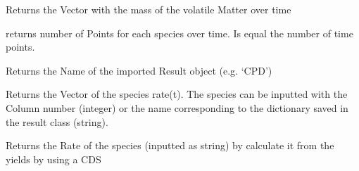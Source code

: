 \documentclass[letterpaper,10pt,english]{sphinxmanual}
\begin{document}
\begin{fulllineitems}
\begin{fulllineitems}
\end{fulllineitems}


\begin{fulllineitems}
\label{FittingClasses:FitInfo.Fit_one_run.MassVM_s}
Returns the Vector with the mass of the volatile Matter over time

\end{fulllineitems}


\begin{fulllineitems}
\label{FittingClasses:FitInfo.Fit_one_run.NPoints}
returns number of Points for each species over time. Is equal the number of time points.

\end{fulllineitems}


\begin{fulllineitems}
\label{FittingClasses:FitInfo.Fit_one_run.Name}
Returns the Name of the imported Result object (e.g. `CPD')

\end{fulllineitems}


\begin{fulllineitems}
\label{FittingClasses:FitInfo.Fit_one_run.Rate}
Returns the Vector of the species rate(t). The species can be inputted with the Column number (integer) or the name corresponding to the dictionary saved in the result class (string).

\end{fulllineitems}


\begin{fulllineitems}
\label{FittingClasses:FitInfo.Fit_one_run.RateSingleSpec}
Returns the Rate of the species (inputted as string) by calculate it from the yields by using a CDS

\end{fulllineitems}


\end{fulllineitems}
\end{document}
